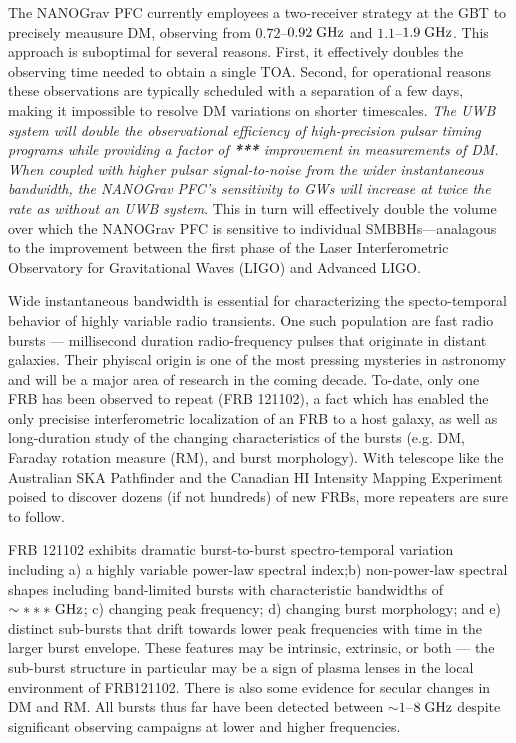 \documentclass[10pt]{myNSF}
\begin{document}
The NANOGrav PFC currently employees a two-receiver strategy at the
GBT to precisely meausure DM, observing from $0.72$--$0.92\; \textrm{GHz}$ and
$1.1$--$1.9\; \textrm{GHz}$.  This approach is suboptimal for several reasons.
First, it effectively doubles the observing time needed to obtain a
single TOA.  Second, for operational reasons these observations are
typically scheduled with a separation of a few days, making it
impossible to resolve DM variations on shorter timescales.  \emph{The
  UWB system will double the observational efficiency of
  high-precision pulsar timing programs while providing a factor of
  \textbf{***} improvement in measurements of DM.  When coupled with
  higher pulsar signal-to-noise from the wider instantaneous
  bandwidth, the NANOGrav PFC's sensitivity to GWs will increase at
  twice the rate as without an UWB system}.  This in turn will
effectively double the volume over which the NANOGrav PFC is sensitive
to individual SMBBHs---analagous to the improvement between the first
phase of the Laser Interferometric Observatory for Gravitational Waves
(LIGO) and Advanced LIGO.

 Wide instantaneous bandwidth is
essential for characterizing the specto-temporal behavior of highly
variable radio transients.  One such population are fast radio bursts
--- millisecond duration radio-frequency pulses that originate in
distant galaxies.  Their phyiscal origin is one of the most pressing
mysteries in astronomy and will be a major area of research in the
coming decade.  To-date, only one FRB has been observed to repeat (FRB
121102), a fact which has enabled the only precisise interferometric
localization of an FRB to a host galaxy, as well as long-duration
study of the changing characteristics of the bursts (e.g. DM, Faraday
rotation measure (RM), and burst morphology).  With telescope like the
Australian SKA Pathfinder and the Canadian HI Intensity Mapping
Experiment poised to discover dozens (if not hundreds) of new FRBs,
more repeaters are sure to follow.

FRB 121102 exhibits dramatic burst-to-burst spectro-temporal variation
including a) a highly variable power-law spectral index;b)
non-power-law spectral shapes including band-limited bursts with
characteristic bandwidths of $\sim***\ \GHz$; c) changing peak
frequency; d) changing burst morphology; and e) distinct sub-bursts
that drift towards lower peak frequencies with time in the larger
burst envelope.  These features may be intrinsic, extrinsic, or
both --- the sub-burst structure in particular may be a sign of plasma
lenses in the local environment of FRB121102.  There is also some
evidence for secular changes in DM and RM.  All bursts thus far have
been detected between $\sim 1$--$8\; \textrm{GHz}$ despite significant
observing campaigns at lower and higher frequencies.
\end{document}
